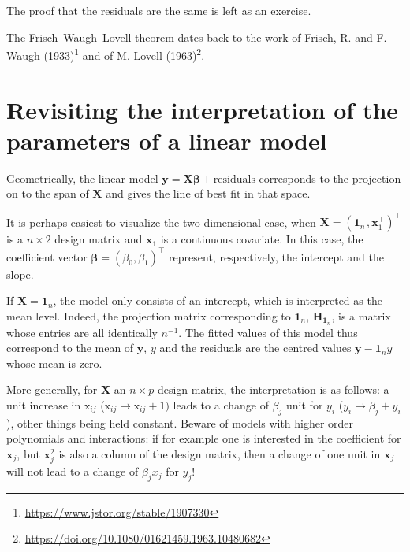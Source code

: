 \documentclass[]{book}
\let\rmarkdownfootnote\footnote%
\def\footnote{\protect\rmarkdownfootnote}
\renewcommand{\href}[2]{#2\footnote{\url{#1}}}
\theoremstyle{definition}
\theoremstyle{definition}
\theoremstyle{definition}
\theoremstyle{remark}
\begin{document}
The proof that the residuals are the same is left as an exercise.

The Frisch--Waugh--Lovell theorem dates back to the work of \href{https://www.jstor.org/stable/1907330}{Frisch, R. and F. Waugh (1933)} and of \href{https://doi.org/10.1080/01621459.1963.10480682}{M. Lovell (1963)}.

\hypertarget{revisiting-the-interpretation-of-the-parameters-of-a-linear-model}{%
\section{Revisiting the interpretation of the parameters of a linear model}\label{revisiting-the-interpretation-of-the-parameters-of-a-linear-model}}

Geometrically, the linear model \(\boldsymbol{y} = \mathbf{X} \boldsymbol{\beta} + \text{residuals}\) corresponds to the projection on to the span of \(\mathbf{X}\) and gives the line of best fit in that space.

It is perhaps easiest to visualize the two-dimensional case, when \(\mathbf{X} = (\mathbf{1}_n^\top, \mathbf{x}_1^\top)^\top\) is a \(n \times 2\) design matrix and \(\mathbf{x}_1\) is a continuous covariate. In this case, the coefficient vector \(\boldsymbol{\beta}=(\beta_0, \beta_1)^\top\) represent, respectively, the intercept and the slope.

If \(\mathbf{X} = \mathbf{1}_n\), the model only consists of an intercept, which is interpreted as the mean level. Indeed, the projection matrix corresponding to \(\mathbf{1}_n\), \(\mathbf{H}_{\mathbf{1}_n}\), is a matrix whose entries are all identically \(n^{-1}\). The fitted values of this model thus correspond to the mean of \(\boldsymbol{y}\), \(\bar{y}\) and the residuals are the centred values \(\boldsymbol{y}-\mathbf{1}_n \bar{y}\) whose mean is zero.

More generally, for \(\mathbf{X}\) an \(n \times p\) design matrix, the interpretation is as follows: a unit increase in \(\mathrm{x}_{ij}\) (\(\mathrm{x}_{ij} \mapsto \mathrm{x}_{ij}+1)\) leads to a change of \(\beta_j\) unit for \(y_i\) (\(y_i \mapsto \beta_j+y_i\)), other things being held constant. Beware of models with higher order polynomials and interactions: if for example one is interested in the coefficient for \(\mathbf{x}_j\), but \(\mathbf{x}_j^2\) is also a column of the design matrix, then a change of one unit in \(\mathbf{x}_j\) will not lead to a change of \(\beta_jx_j\) for \(y_j\)!
\end{document}
